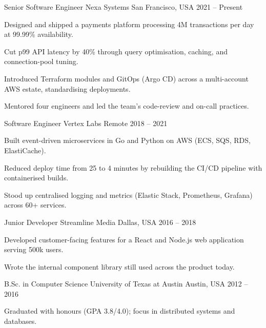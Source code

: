 \documentclass[11pt, a4paper]{awesome-cv}
\begin{document}
\begin{cventries}

  \cventry
    {Senior Software Engineer}
    {Nexa Systems}
    {San Francisco, USA}
    {2021 -- Present}
    {
      \begin{cvitems}
        \item {Designed and shipped a payments platform processing 4M transactions per day at 99.99\% availability.}
        \item {Cut p99 API latency by 40\% through query optimisation, caching, and connection-pool tuning.}
        \item {Introduced Terraform modules and GitOps (Argo CD) across a multi-account AWS estate, standardising deployments.}
        \item {Mentored four engineers and led the team's code-review and on-call practices.}
      \end{cvitems}
    }

  \cventry
    {Software Engineer}
    {Vertex Labs}
    {Remote}
    {2018 -- 2021}
    {
      \begin{cvitems}
        \item {Built event-driven microservices in Go and Python on AWS (ECS, SQS, RDS, ElastiCache).}
        \item {Reduced deploy time from 25 to 4 minutes by rebuilding the CI/CD pipeline with containerised builds.}
        \item {Stood up centralised logging and metrics (Elastic Stack, Prometheus, Grafana) across 60+ services.}
      \end{cvitems}
    }

  \cventry
    {Junior Developer}
    {Streamline Media}
    {Dallas, USA}
    {2016 -- 2018}
    {
      \begin{cvitems}
        \item {Developed customer-facing features for a React and Node.js web application serving 500k users.}
        \item {Wrote the internal component library still used across the product today.}
      \end{cvitems}
    }

\end{cventries}

\begin{cventries}
  \cventry
    {B.Sc. in Computer Science}
    {University of Texas at Austin}
    {Austin, USA}
    {2012 -- 2016}
    {
      \begin{cvitems}
        \item {Graduated with honours (GPA 3.8/4.0); focus in distributed systems and databases.}
      \end{cvitems}
    }
\end{cventries}
\end{document}
